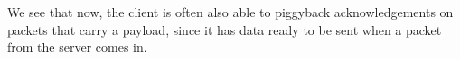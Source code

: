 We see that now, the client is often also able to piggyback acknowledgements on packets that carry a payload, since it has data ready to be sent when a packet from the server comes in.